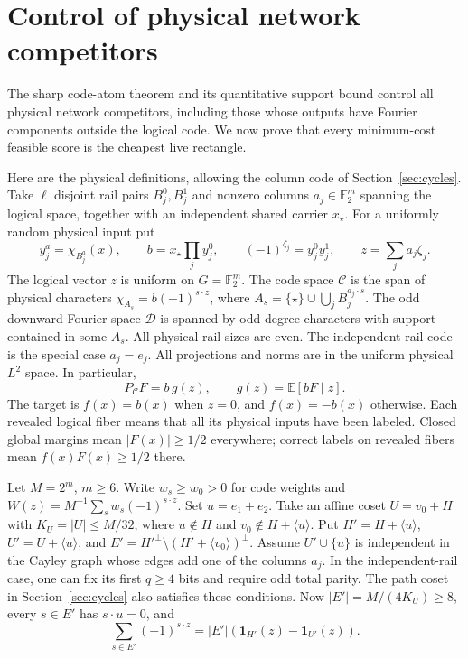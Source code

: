 \section{Control of physical network competitors}
\label{app:physical}

The sharp code-atom theorem and its quantitative support bound control
all physical network competitors, including those whose outputs have
Fourier components outside the logical code. We now prove that every
minimum-cost feasible score is the cheapest live rectangle.

Here are the physical definitions, allowing the column code of
Section~\ref{sec:cycles}. Take $\ell$ disjoint rail pairs $B_j^0,B_j^1$
and nonzero columns $a_j\in\mathbb F_2^m$ spanning the logical space,
together with an independent shared carrier $x_\star$.
For a uniformly random physical input put
\[
 y_j^a=\chi_{B_j^a}(x),\qquad b=x_\star\prod_j y_j^0,\qquad
 (-1)^{\zeta_j}=y_j^0y_j^1,\qquad z=\sum_j a_j\zeta_j.
\]
The logical vector $z$ is uniform on $G=\mathbb F_2^m$.
The code space $\mathcal C$ is the span of physical characters
$\chi_{A_s}=b(-1)^{s\cdot z}$, where
$A_s=\{\star\}\cup\bigcup_jB_j^{a_j\cdot s}$. The odd downward
Fourier space $\mathcal D$ is spanned by odd-degree characters with
support contained in some $A_s$. All physical rail sizes are even. The independent-rail code is the special case $a_j=e_j$.
All projections and norms are in the uniform physical $L^2$ space.
In particular,
\[
 P_{\mathcal C}F=b\,g(z),\qquad g(z)=\mathbb E[bF\mid z].
\]
The target is $f(x)=b(x)$ when $z=0$, and $f(x)=-b(x)$ otherwise.
Each revealed logical fiber means that all its physical inputs have
been labeled. Closed global margins mean $|F(x)|\ge1/2$ everywhere;
correct labels on revealed fibers mean $f(x)F(x)\ge1/2$ there.


Let $M=2^m$, $m\ge6$. Write
$w_s\ge w_0>0$ for code weights and
$W(z)=M^{-1}\sum_s w_s(-1)^{s\cdot z}$. Set $u=e_1+e_2$.
Take an affine coset $U=v_0+H$ with $K_U=|U|\le M/32$,
where $u\notin H$ and $v_0\notin H+\langle u\rangle$. Put
$H'=H+\langle u\rangle$, $U'=U+\langle u\rangle$, and
$E'=H'^\perp\setminus(H'+\langle v_0\rangle)^\perp$.
Assume $U'\cup\{u\}$ is independent in the Cayley graph whose
edges add one of the columns $a_j$. In the independent-rail case,
one can fix its first $q\ge4$ bits and require odd total parity.
The path coset in Section~\ref{sec:cycles} also satisfies these conditions.
Now $|E'|=M/(4K_U)\ge8$, every $s\in E'$ has $s\cdot u=0$, and
\[
 \sum_{s\in E'}(-1)^{s\cdot z}
 =|E'|(\mathbf1_{H'}(z)-\mathbf1_{U'}(z)).
\]

